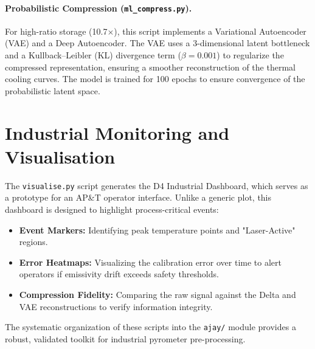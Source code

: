 \paragraph{Probabilistic Compression (\texttt{ml\_compress.py}).}
For high-ratio storage (10.7$\times$), this script implements a Variational Autoencoder (VAE) and a Deep Autoencoder. The VAE uses a 3-dimensional latent bottleneck and a Kullback--Leibler (KL) divergence term ($\beta=0.001$) to regularize the compressed representation, ensuring a smoother reconstruction of the thermal cooling curves. The model is trained for 100 epochs to ensure convergence of the probabilistic latent space.

\section{Industrial Monitoring and Visualisation}
\label{sec:visualisation}

The \texttt{visualise.py} script generates the D4 Industrial Dashboard, which serves as a prototype for an AP\&T operator interface. Unlike a generic plot, this dashboard is designed to highlight process-critical events:
\begin{itemize}[leftmargin=2em]
    \item \textbf{Event Markers:} Identifying peak temperature points and "Laser-Active" regions.
    \item \textbf{Error Heatmaps:} Visualizing the calibration error over time to alert operators if emissivity drift exceeds safety thresholds.
    \item \textbf{Compression Fidelity:} Comparing the raw signal against the Delta and VAE reconstructions to verify information integrity.
\end{itemize}

The systematic organization of these scripts into the \texttt{ajay/} module provides a robust, validated toolkit for industrial pyrometer pre-processing.

